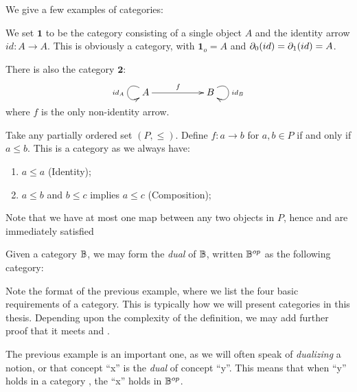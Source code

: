 We give a few examples of categories:

\begin{example}\label{ex:small_finite_categories}
  We set $\mathbf{1}$ to be the category consisting of a single object $A$ and the identity arrow
  $id:A\to A$. This  is obviously a category, with $\mathbf{1}_o = A$ and
  $\partial_0({id}) = \partial_1({id}) = A$.

  There is also the category $\mathbf{2}$:
  \[
    \xymatrix{
      A\ar[rr]^{f} \ar@(ul,dl)[]_{id_A}& & B  \ar@(ur,dr)[]^{id_B}
    }
  \]
  where $f$ is the only non-identity arrow.
\end{example}

\begin{example}\label{ex:preorders-are-categories}
  Take any partially ordered set $(P,\le)$. Define $f:a \to b$ for $a,b\in P$ if and only if
  $a\le b$. This is a category as we always have:
  \begin{enumerate}[{(}i{)}]
  \item $a \le a$ (Identity);
  \item $a \le b$ and $b \le c$ implies $a\le c$ (Composition);
  \end{enumerate}
  Note that we have at most one map between any two objects in $P$, hence \catone and \cattwo are
  immediately satisfied
\end{example}
\begin{example}\label{ex:dual_category}
Given a category $\mathbb{B}$, we may form the \emph{dual} of $\mathbb{B}$, written $\mathbb{B}^{op}$ as the following
category:
\end{example}

Note the format of the previous example, where we list the four basic requirements of a
category. This is typically how we will present categories in this thesis. Depending upon the
complexity of the definition, we may add further proof that it meets \catone and \cattwo.

The previous example is an important one, as we will often speak of \emph{dualizing} a notion, or
that concept ``x'' is the \emph{dual} of concept ``y''. This means that when ``y'' holds in a
category \B, the ``x'' holds in $\mathbb{B}^{op}$.


